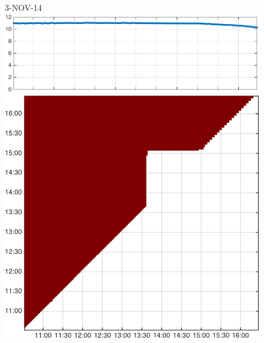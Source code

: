 \begin{figure}
\begin{minipage}[c]{\mylength}
\end{minipage}
\begin{minipage}[c]{\mylength}
\centering \scriptsize 3-NOV-14 \\
\includegraphics[valign=t,trim=0 0 5pt 0,angle=90,origin=tr,width=\sunintwidth,totalheight=\eventheight]{events/20141103-intensity.pdf}
\includegraphics[valign=t,width=\eventswidth]{events/20141103-maxGain-local-events.png}

\end{minipage}
\end{figure}
